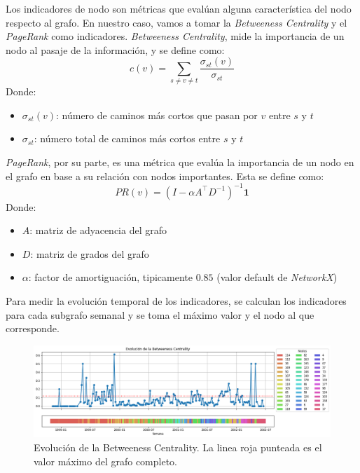 \documentclass{article}
\begin{document}
Los indicadores de nodo son métricas que evalúan alguna característica del nodo respecto al grafo. En nuestro caso, vamos a tomar la \emph{Betweeness Centrality} y el \emph{PageRank} como indicadores. \emph{Betweeness Centrality}, mide la importancia de un nodo al pasaje de la información, y se define como:
\begin{equation}
    c(v) = \sum_{s \neq v \neq t} \frac{\sigma_{st}(v)}{\sigma_{st}}
    \label{eq:betweeness_centrality}
\end{equation}
Donde:
\begin{itemize}
    \item $\sigma_{st}(v)$: número de caminos más cortos que pasan por $v$ entre $s$ y $t$
    \item $\sigma_{st}$: número total de caminos más cortos entre $s$ y $t$
\end{itemize}
\emph{PageRank}, por su parte, es una métrica que evalúa la importancia de un nodo en el grafo en base a su relación con nodos importantes. Esta se define como:
\begin{equation}
    PR(v) = (I - \alpha A^\top D^{-1})^{-1} \mathbf{1}
    \label{eq:page_rank}
\end{equation}
Donde:
\begin{itemize}
    \item $A$: matriz de adyacencia del grafo
    \item $D$: matriz de grados del grafo
    \item $\alpha$: factor de amortiguación, tipicamente $0.85$ (valor default de \textit{NetworkX})
\end{itemize}

Para medir la evolución temporal de los indicadores, se calculan los indicadores para cada subgrafo semanal y se toma el máximo valor y el nodo al que corresponde.

\begin{figure}[htb]
    \centering
    \includegraphics[width=\linewidth]{imagenes/ej1/betweeness.png}
    \caption{Evolución de la Betweeness Centrality. La linea roja punteada es el valor máximo del grafo completo.}
    \label{fig:betweeness_centrality}
\end{figure}
\end{document}
